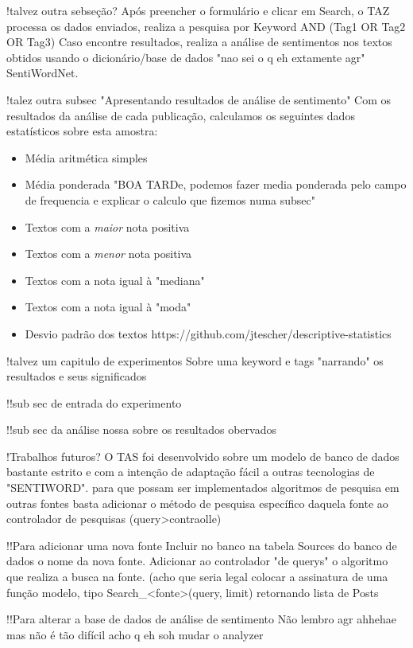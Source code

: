 !talvez outra sebseção?
Após preencher o formulário e clicar em Search, o TAZ processa os dados enviados, realiza a pesquisa por 
Keyword AND (Tag1 OR Tag2 OR Tag3)
Caso encontre resultados, realiza a análise de sentimentos nos textos obtidos usando o dicionário/base de dados "nao sei o q eh extamente agr" SentiWordNet.

!talez outra subsec "Apresentando resultados de análise de sentimento"
Com os resultados da análise de cada publicação, calculamos os seguintes dados estatísticos sobre esta amostra:
\begin{itemize}
    \item Média aritmética simples
    \item Média ponderada "BOA TARDe, podemos fazer media ponderada pelo campo de frequencia e explicar o calculo que fizemos numa subsec"
    \item Textos com a \textit{maior} nota positiva
    \item Textos com a \textit{menor} nota positiva
    \item Textos com a nota igual à "mediana"
    \item Textos com a nota igual à "moda"
    \item Desvio padrão dos textos
    https://github.com/jtescher/descriptive-statistics
\end{itemize}

!talvez um capitulo de experimentos
Sobre uma keyword e tags "narrando" os resultados e seus significados

!!sub sec de entrada do experimento

!!sub sec da análise nossa sobre os resultados obervados

!Trabalhos futuros?
O TAS foi desenvolvido sobre um modelo de banco de dados bastante estrito e com a intenção de adaptação fácil a outras tecnologias de "SENTIWORD".
para que possam ser implementados algoritmos de pesquisa em outras fontes basta adicionar o método de pesquisa específico daquela fonte ao controlador de pesquisas (query>contraolle)

!!Para adicionar uma nova fonte
Incluir no banco na tabela Sources do banco de dados o nome da nova fonte.
Adicionar ao controlador "de querys" o algoritmo que realiza a busca na fonte.
(acho que seria legal colocar a assinatura de uma função modelo, tipo Search_<fonte>(query, limit) retornando lista de Posts

!!Para alterar a base de dados de análise de sentimento
Não lembro agr ahhehae mas não é tão difícil acho q eh soh mudar o analyzer






















